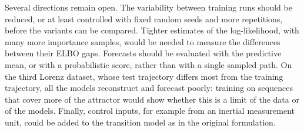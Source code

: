 Several directions remain open. The variability between training runs
should be reduced, or at least controlled with fixed random seeds and
more repetitions, before the variants can be compared. Tighter estimates
of the log-likelihood, with many more importance samples, would be
needed to measure the differences between their ELBO gaps.
Forecasts should be evaluated with the predictive mean, or with a
probabilistic score, rather than with a single sampled path. On the
third Lorenz dataset, whose test trajectory differs most from the
training trajectory, all the models reconstruct and forecast poorly:
training on sequences that cover more of the attractor would show
whether this is a limit of the data or of the models. Finally, control
inputs, for example from an inertial
measurement unit, could be added to the transition model as in the
original formulation.
